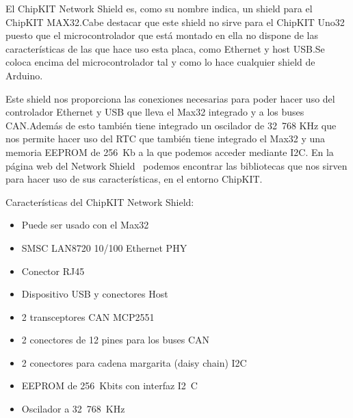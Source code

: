 El ChipKIT Network Shield es, como su nombre indica, un shield para el ChipKIT MAX32.\@ Cabe destacar que este shield no sirve para el ChipKIT Uno32 puesto que el microcontrolador que está montado en ella no dispone de las características de las que hace uso esta placa, como Ethernet y host USB.\@ Se coloca encima del microcontrolador tal y como lo hace cualquier shield de Arduino.


Este shield nos proporciona las conexiones necesarias para poder hacer uso del controlador Ethernet y USB que lleva el Max32 integrado y a los buses CAN.\@ Además de esto también tiene integrado un oscilador de 32~768 KHz que nos permite hacer uso del RTC que también tiene integrado el Max32 y una memoria EEPROM de 256~Kb a la que podemos acceder mediante I2C. En la página web del Network Shield~\cite{website:network_shield} podemos encontrar las bibliotecas que nos sirven para hacer uso de sus características, en el entorno ChipKIT.\@

Características del ChipKIT Network Shield:
\begin{itemize}
	\item Puede ser usado con el Max32
	\item SMSC LAN8720 10/100 Ethernet PHY
	\item Conector RJ45
	\item Dispositivo USB y conectores Host
	\item 2 transceptores CAN MCP2551
	\item 2 conectores de 12 pines para los buses CAN
	\item 2 conectores para cadena margarita (daisy chain) I2C
	\item EEPROM de 256~Kbits con interfaz I2~C
	\item Oscilador a 32~768~KHz
\end{itemize}



